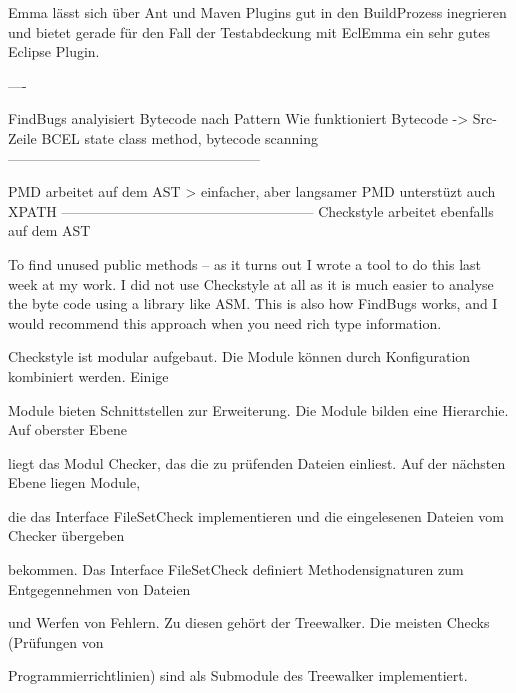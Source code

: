 Emma lässt sich über Ant und Maven Plugins gut in den BuildProzess inegrieren und bietet gerade für den Fall der Testabdeckung mit EclEmma ein sehr gutes Eclipse Plugin.

----

FindBugs analyisiert Bytecode nach Pattern
Wie funktioniert Bytecode -> Src-Zeile
BCEL
state class method, bytecode scanning
------------------------------------------------------

PMD arbeitet auf dem AST > einfacher, aber langsamer
PMD unterstüzt auch XPATH
------------------------------------------------------
Checkstyle arbeitet ebenfalls auf dem AST


To find unused public methods -- as it turns out I wrote a tool to do this last week at my work. I did not use Checkstyle at all as it is much easier to analyse the byte code using a library like ASM. This is also how FindBugs works, and I would recommend this approach when you need rich type information. 


Checkstyle ist modular aufgebaut. Die Module können durch Konfiguration kombiniert werden. Einige 

Module bieten Schnittstellen zur Erweiterung. Die Module bilden eine Hierarchie. Auf oberster Ebene 

liegt das Modul Checker, das die zu prüfenden Dateien einliest. Auf der nächsten Ebene liegen Module, 

die das Interface FileSetCheck implementieren und die eingelesenen Dateien vom Checker übergeben 

bekommen. Das Interface FileSetCheck definiert Methodensignaturen zum Entgegennehmen von Dateien 

und Werfen von Fehlern. Zu diesen gehört der Treewalker. Die meisten Checks (Prüfungen von 

Programmierrichtlinien) sind als Submodule des Treewalker implementiert.



